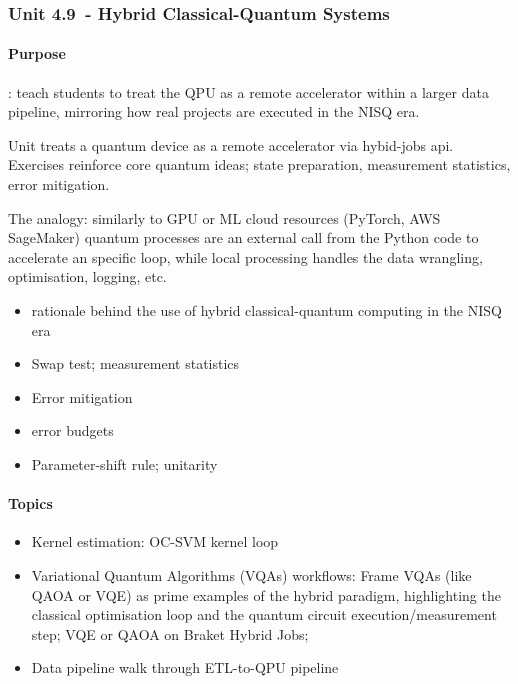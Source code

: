 \subsubsection*{Unit 4.9 - Hybrid Classical-Quantum Systems}

\paragraph{Purpose}: teach students to treat the QPU as a remote accelerator within 
a larger data pipeline, mirroring how real projects are executed in the NISQ era.

Unit treats a quantum device as a remote accelerator via hybid-jobs api.
Exercises reinforce core quantum ideas; state preparation, measurement statistics, error mitigation.

The analogy: similarly to GPU or ML cloud resources (PyTorch, AWS SageMaker) 
quantum processes are an external call from the Python code to accelerate 
an specific loop, while local processing handles the data wrangling, optimisation, logging, etc.

\begin{itemize}
	\item rationale behind the use of hybrid classical-quantum computing in the NISQ era
	\item Swap test; measurement statistics
	\item Error mitigation
	\item error budgets
	\item Parameter-shift rule; unitarity	
\end{itemize}


\paragraph{Topics}
\begin{itemize}
	\item Kernel estimation: OC-SVM kernel loop
	\item Variational Quantum Algorithms (VQAs) workflows: 
	Frame VQAs (like QAOA or VQE) as prime examples of the hybrid paradigm, 
	highlighting the classical optimisation loop and the quantum circuit execution/measurement step; 
	VQE or QAOA on Braket Hybrid Jobs; 
	\item Data pipeline walk through ETL-to-QPU pipeline
\end{itemize}

